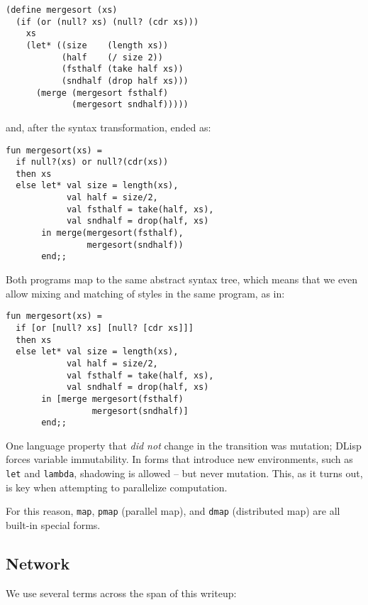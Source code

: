 \documentclass[letterpaper,twocolumn,10pt]{article}
\begin{document}
\begin{verbatim}
(define mergesort (xs)
  (if (or (null? xs) (null? (cdr xs)))
    xs
    (let* ((size    (length xs))
           (half    (/ size 2))
           (fsthalf (take half xs))
           (sndhalf (drop half xs)))
      (merge (mergesort fsthalf)
             (mergesort sndhalf)))))
\end{verbatim}

and, after the syntax transformation, ended as:

\begin{verbatim}
fun mergesort(xs) =
  if null?(xs) or null?(cdr(xs))
  then xs
  else let* val size = length(xs),
            val half = size/2,
            val fsthalf = take(half, xs),
            val sndhalf = drop(half, xs)
       in merge(mergesort(fsthalf),
                mergesort(sndhalf))
       end;;
\end{verbatim}

Both programs map to the same abstract syntax tree, which means that we even
allow mixing and matching of styles in the same program, as in:

\begin{verbatim}
fun mergesort(xs) =
  if [or [null? xs] [null? [cdr xs]]]
  then xs
  else let* val size = length(xs),
            val half = size/2,
            val fsthalf = take(half, xs),
            val sndhalf = drop(half, xs)
       in [merge mergesort(fsthalf)
                 mergesort(sndhalf)]
       end;;
\end{verbatim}

One language property that \textit{did not} change in the transition was
mutation; DLisp forces variable immutability. In forms that introduce new
environments, such as \verb|let| and \verb|lambda|, shadowing is allowed -- but
never mutation. This, as it turns out, is key when attempting to parallelize
computation.

For this reason, \verb|map|, \verb|pmap| (parallel map), and \verb|dmap|
(distributed map) are all built-in special forms.

\subsection{Network}

We use several terms across the span of this writeup:
\end{document}
